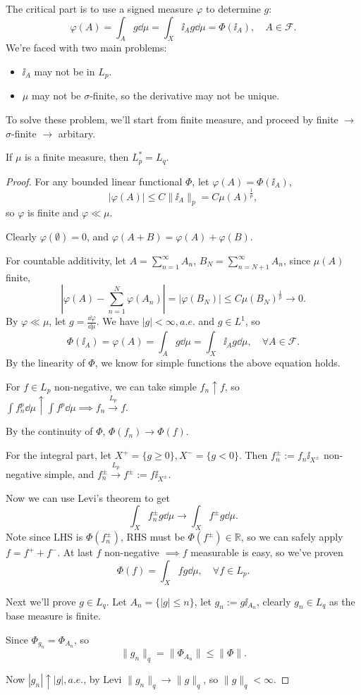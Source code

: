 The critical part is to use a signed measure $\varphi$ to determine $g$:
\[
\varphi(A) = \int_A g\dd\mu = \int_X \ii_A g\dd\mu = \Phi(\ii_A),
\quad A\in \mathscr{F}.
\]
We're faced with two main problems:
\begin{itemize}
	\item $\ii_A$ may not be in $L_p$.
	\item $\mu$ may not be $\sigma$-finite, so the derivative may not be unique.
\end{itemize}

To solve these problem, we'll start from finite measure,
and proceed by finite $\to$ $\sigma$-finite $\to$ arbitary.

\begin{proposition}
	If $\mu$ is a finite measure, then $L_p^* = L_q$.
\end{proposition}
\begin{proof}[Proof]
    For any bounded linear functional $\Phi$, let $\varphi(A) = \Phi(\ii_A)$,
	\[
	|\varphi(A)|\le C\lVert \ii_A \rVert _p = C \mu(A)^{\frac{1}{p}},
	\]
	so $\varphi$ is finite and $\varphi\ll\mu$.

	Clearly $\varphi(\emptyset) = 0$, and $\varphi(A + B) = \varphi(A) + \varphi(B)$.

	For countable additivity, let $A = \sum_{n=1}^{\infty} A_n$,
	$B_N = \sum_{n=N+1}^{\infty} A_n$, since $\mu(A)$ finite,
	\[
	\left| \varphi(A) - \sum_{n=1}^{N} \varphi(A_n) \right| = |\varphi(B_N)|
	\le C \mu(B_N)^{\frac{1}{p}} \to 0.
	\]
	By $\varphi\ll \mu$, let $g = \frac{\dd\varphi}{\dd\mu}$.
	We have $|g|< \infty, a.e.$ and $g\in L^1$, so
	\[
	\Phi(\ii_A) = \varphi(A) = \int_A g\dd\mu = \int_X \ii_A g\dd \mu,\quad
	\forall A\in \mathscr{F}.
	\]
	By the linearity of $\Phi$, we know for simple functions
	the above equation holds.

	For $f\in L_p$ non-negative, we can take simple $f_n\uparrow f$,
	so $\int f_n^p \dd\mu \uparrow \int f^p\dd\mu \implies f_n \xrightarrow{L_p} f $.

	By the continuity of $\Phi$, $\Phi(f_n)\to \Phi(f)$.

	For the integral part, let $X^+ = \{g \ge 0\}, X^- = \{g < 0\}$.
	Then $f_n^\pm := f_n \ii_{X^\pm}$ non-negative simple,
	and $f_n^\pm \xrightarrow{L_p} f^\pm := f\ii_{X^\pm}$.

	Now we can use Levi's theorem to get
	\[
	\int_X f_n^\pm g\dd \mu \to \int_X f^\pm g\dd\mu.
	\]
	Note since LHS is  $\Phi(f_n^\pm)$, RHS must be $\Phi(f^\pm)\in \mathbb{R}$,
	so we can safely apply $f = f^+ + f^-$.
	At last $f$ non-negative $ \implies f$ measurable is easy, so we've proven
	\[
	\Phi(f) = \int_X fg\dd\mu,\quad \forall f\in L_p.
	\]

	Next we'll prove $g\in L_q$.
	Let $A_n = \{|g|\le n\}$, let $g_n := g\ii_{A_n}$, clearly $g_n \in L_q$ as
	the base measure is finite.

	Since $\Phi_{g_n} = \Phi_{A_n}$, so
	\[
	\lVert g_n \rVert _q = \lVert \Phi_{A_n} \rVert \le \lVert \Phi \rVert.
	\]

	Now $|g_n| \uparrow |g|, a.e.$, by Levi
	$\lVert g_n \rVert _q\to \lVert g \rVert _q$, so $\lVert g \rVert _q < \infty$.
\end{proof}

